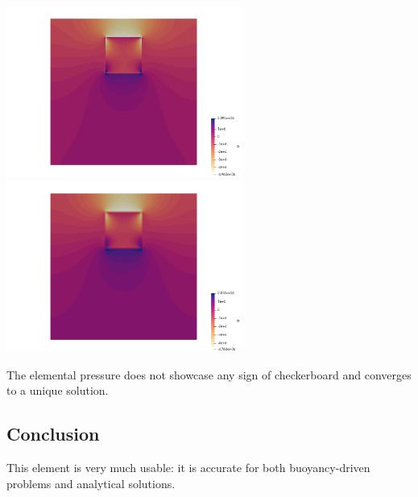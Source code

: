 \begin{center}
\includegraphics[width=7.7cm]{python_codes/fieldstone_80/results/block/p}
\includegraphics[width=7.7cm]{python_codes/fieldstone_80/results/block/q}
\end{center}
The elemental pressure does not showcase any sign of checkerboard and converges to a unique solution. 


\subsection*{Conclusion}

This element is very much usable: it is accurate for both buoyancy-driven problems and 
analytical solutions. 




